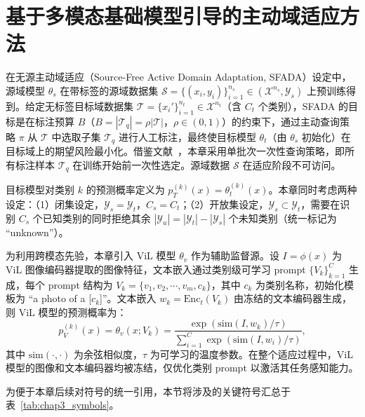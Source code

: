 \section{基于多模态基础模型引导的主动域适应方法}

\label{sec:chap3_damf}

在无源主动域适应（Source-Free Active Domain Adaptation, SFADA）设定中，源域模型 $\theta_s$ 在带标签的源域数据集 $\mathcal{S}=\{(x_i,y_i)\}_{i=1}^{n_s}\in(\mathcal{X}^{n_s},\mathcal{Y}_s)$ 上预训练得到。给定无标签目标域数据集 $\mathcal{T}=\{x_i'\}_{i=1}^{n_t}\in\mathcal{X}^{n_t}$（含 $C_t$ 个类别），SFADA 的目标是在标注预算 $B$（$B=|\mathcal{T}_q|=\rho|\mathcal{T}|$，$\rho\in(0,1)$）的约束下，通过主动查询策略 $\pi$ 从 $\mathcal{T}$ 中选取子集 $\mathcal{T}_q$ 进行人工标注，最终使目标模型 $\theta_t$（由 $\theta_s$ 初始化）在目标域上的期望风险最小化。借鉴文献~\cite{wang2023mhpl,chu2022denoised}，本章采用单批次一次性查询策略，即所有标注样本 $\mathcal{T}_q$ 在训练开始前一次性选定。源域数据 $\mathcal{S}$ 在适应阶段不可访问。

目标模型对类别 $k$ 的预测概率定义为 $p_T^{(k)}(x)=\theta_t^{(k)}(x)$。本章同时考虑两种设定：（1）闭集设定，$\mathcal{Y}_s=\mathcal{Y}_t$，$C_s=C_t$；（2）开放集设定，$\mathcal{Y}_s\subset\mathcal{Y}_t$，需要在识别 $C_s$ 个已知类别的同时拒绝其余 $|\mathcal{Y}_u|=|\mathcal{Y}_t|-|\mathcal{Y}_s|$ 个未知类别（统一标记为 ``unknown''）。

为利用跨模态先验，本章引入 ViL 模型 $\theta_v$ 作为辅助监督源。设 $I=\phi(x)$ 为 ViL 图像编码器提取的图像特征，文本嵌入通过类别级可学习 prompt $\{V_k\}_{k=1}^{C}$ 生成，每个 prompt 结构为 $V_k=\{v_1,v_2,\cdots,v_m,c_k\}$，其中 $c_k$ 为类别名称，初始化模板为 ``a photo of a [$c_k$]''。文本嵌入 $w_k=\mathrm{Enc}_t(V_k)$ 由冻结的文本编码器生成，则 ViL 模型的预测概率为：
\begin{equation}
p_V^{(k)}(x) = \theta_v(x; V_k) = \frac{\exp(\mathrm{sim}(I, w_k)/\tau)}{\sum_{i=1}^{C}\exp(\mathrm{sim}(I, w_i)/\tau)},
\label{eq:vil_pred}
\end{equation}
其中 $\mathrm{sim}(\cdot,\cdot)$ 为余弦相似度，$\tau$ 为可学习的温度参数。在整个适应过程中，ViL 模型的图像和文本编码器均被冻结，仅优化类别 prompt 以激活其任务感知能力。

为便于本章后续对符号的统一引用，本节将涉及的关键符号汇总于表~\ref{tab:chap3_symbols}。

